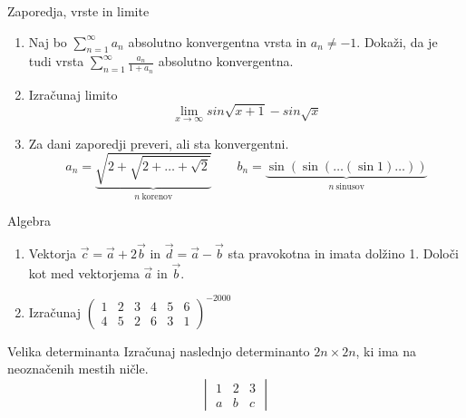 \begin{frame}{Zaporedja, vrste in limite}
	\begin{enumerate}
		\item 
		Naj bo $\sum_{n=1}^{\infty} a_n$ absolutno konvergentna vrsta in $a_n \ne -1$.
		Dokaži, da je tudi vrsta $\sum_{n=1}^\infty \frac{a_n}{1+a_n}$
		absolutno konvergentna.

		\item
		Izračunaj limito
		$$\lim_{x\longrightarrow\infty}{sin\sqrt{x+1}-sin\sqrt{x}}$$

		\item
		Za dani zaporedji preveri, ali sta konvergentni.
		$$
		a_n = \underbrace{\sqrt{2+\sqrt{2+\dots+\sqrt{2}}}}_{n~\text{korenov}} \qquad 
		b_n = \underbrace{\sin(\sin(\dots(\sin 1)\dots))}_{n~\text{sinusov}}
		$$

	\end{enumerate}
\end{frame}

\begin{frame}{Algebra}
	\begin{enumerate}
		\item
		Vektorja $\vec{c}=\vec{a} + 2\vec{b}$ in $\vec{d}=\vec{a}-\vec{b}$
		sta pravokotna in imata dolžino 1. Določi kot med vektorjema $\vec{a}$ in $\vec{b}$.
		\item 
		Izračunaj
		$ \begin{pmatrix}
			1 & 2 & 3 & 4 & 5 & 6\\
			4 & 5 & 2 & 6 & 3 & 1
			\end{pmatrix}^{-2000} $
	\end{enumerate}
\end{frame}

\begin{frame}{Velika determinanta}
	Izračunaj naslednjo determinanto $2n \times 2n$, ki ima na neoznačenih mestih ničle.
	$$
	\begin{vmatrix}
		1 & 2 & 3\\
		a & b & c
		\end{vmatrix}
	$$
\end{frame}

